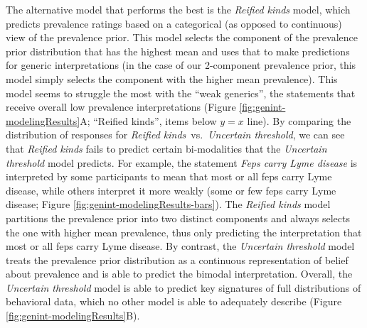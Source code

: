 \documentclass[floatsintext,doc]{apa6}
\begin{document}
The alternative model that performs the best is the \emph{Reified kinds} model, which predicts prevalence ratings based on a categorical (as opposed to continuous) view of the prevalence prior. This model selects the component of the prevalence prior distribution that has the highest mean and uses that to make predictions for generic interpretations (in the case of our 2-component prevalence prior, this model simply selects the component with the higher mean prevalence). 
This model seems to struggle the most with the ``weak generics'', the statements that receive overall low prevalence interpretations (Figure \ref{fig:genint-modelingResults}A; ``Reified kinds'', items below $y = x$ line).
By comparing the distribution of responses for \emph{Reified kinds}~vs.~\emph{Uncertain threshold}, we can see that  \emph{Reified kinds} fails to predict certain bi-modalities that the \emph{Uncertain threshold} model predicts.
For example, the statement \emph{Feps carry Lyme disease} is interpreted by some participants to mean that most or all feps carry Lyme disease, while others interpret it more weakly (some or few feps carry Lyme disease; Figure \ref{fig:genint-modelingResults-bars}). 
The \emph{Reified kinds} model partitions the prevalence prior into two distinct components and always selects the one with higher mean prevalence, thus only predicting the interpretation that most or all feps carry Lyme disease. 
By contrast, the \emph{Uncertain threshold} model treats the prevalence prior distribution as a continuous representation of belief about prevalence and is able to predict the bimodal interpretation. 
Overall, the \emph{Uncertain threshold} model is able to predict key signatures of full distributions of behavioral data, which no other model is able to adequately describe (Figure \ref{fig:genint-modelingResults}B).


\end{document}
